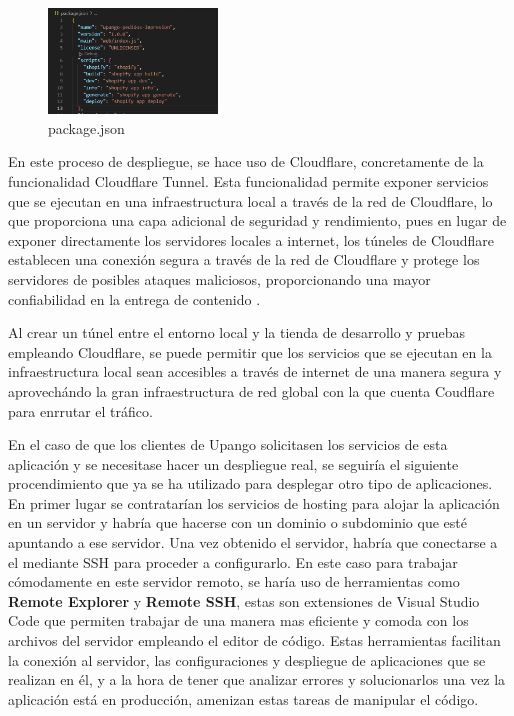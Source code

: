\documentclass[11pt]{article}
\begin{document}
\begin{figure}[H]
    \centering
    \includegraphics[width=0.4\textwidth]{imagenes/package.json.scripts.png}
    \caption{\label{fig:scriptsPackageJson}package.json}
    \vspace{\fill}
\end{figure}

En este proceso de despliegue, se hace uso de Cloudflare, concretamente de la funcionalidad Cloudflare Tunnel. Esta funcionalidad permite exponer servicios que se ejecutan
en una infraestructura local a través de la red de Cloudflare, lo que proporciona una capa adicional de seguridad y rendimiento, pues en lugar de 
exponer directamente los servidores locales a internet, los túneles de Cloudflare establecen una conexión segura a través de la red de Cloudflare y protege los
servidores de posibles ataques maliciosos, proporcionando una mayor confiabilidad en la entrega de contenido \cite{cloudflare}. 

Al crear un túnel entre el entorno local y la tienda de desarrollo y pruebas empleando Cloudflare, se puede permitir que los servicios que se ejecutan en la infraestructura local
sean accesibles a través de internet de una manera segura y aprovechándo la gran infraestructura de red global con la que cuenta Coudflare para enrrutar el tráfico.

En el caso de que los clientes de Upango solicitasen los servicios de esta aplicación y se necesitase hacer un despliegue real, se seguiría el siguiente procendimiento que ya se ha utilizado para
desplegar otro tipo de aplicaciones.
En primer lugar se contratarían los servicios de hosting para alojar la aplicación en un servidor y habría que hacerse con un dominio o subdominio
que esté apuntando a ese servidor. Una vez obtenido el servidor, habría que conectarse a el mediante SSH para proceder a configurarlo. En este caso para trabajar cómodamente en este servidor remoto,
se haría uso de herramientas como \textbf{Remote Explorer} y \textbf{Remote SSH}, estas son extensiones de Visual Studio Code que permiten trabajar de una manera mas eficiente y comoda con los archivos del
servidor empleando el editor de código. Estas herramientas facilitan la conexión al servidor, las configuraciones y despliegue de aplicaciones que se realizan en él, y a la hora 
de tener que analizar errores y solucionarlos una vez la aplicación está en producción, amenizan estas tareas de manipular el código.
\end{document}

